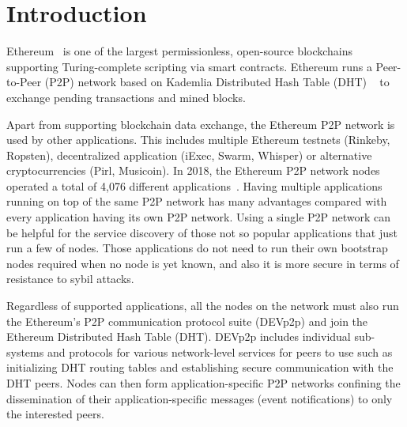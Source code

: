 
\section{Introduction}
 Ethereum~\cite{buterin2013ethereum}  is one of the largest permissionless,  open-source  blockchains supporting Turing-complete scripting via smart contracts. Ethereum runs a Peer-to-Peer (P2P) network based on Kademlia Distributed Hash Table (DHT) ~\cite{maymounkov2002kademlia} to exchange pending transactions and mined blocks. 

Apart from supporting blockchain data exchange, the Ethereum P2P network is used by other applications. This includes multiple Ethereum testnets (Rinkeby, Ropsten), decentralized application (iExec, Swarm, Whisper) or alternative cryptocurrencies (Pirl, Musicoin). In 2018, the Ethereum P2P network nodes operated a total of 4,076 different applications~\cite{kim2018measuring}. 
Having multiple applications running on top of the same P2P network has many advantages compared with every application having its own P2P network.
Using a single P2P network can be helpful for the service discovery of those not so popular applications that just run a few of nodes. 
Those applications do not need to run their own bootstrap nodes required when no node is yet known,  and also it is more secure in terms of resistance to sybil attacks. 

Regardless of supported applications, all the nodes on the network must also run the Ethereum’s P2P communication protocol suite (DEVp2p) and join the Ethereum Distributed Hash Table (DHT). 
DEVp2p includes individual sub-systems and protocols for various network-level services for peers to use such as initializing DHT routing tables and establishing secure communication with the DHT peers. 
Nodes can then form application-specific P2P networks confining the dissemination of their application-specific messages (\eg event notifications) to only the interested peers.

